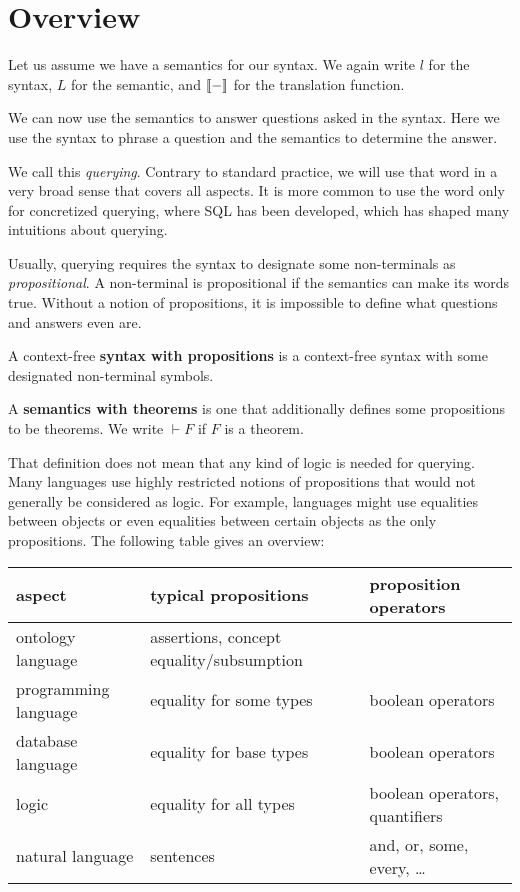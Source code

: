 \section{Overview}

Let us assume we have a semantics for our syntax.
We again write $l$ for the syntax, $L$ for the semantic, and $\llbracket -\rrbracket$ for the translation function.

We can now use the semantics to answer questions asked in the syntax.
Here we use the syntax to phrase a question and the semantics to determine the answer.

We call this \emph{querying}.
Contrary to standard practice, we will use that word in a very broad sense that covers all aspects.
It is more common to use the word only for concretized querying, where SQL has been developed, which has shaped many intuitions about querying.

Usually, querying requires the syntax to designate some non-terminals as \emph{propositional}.
A non-terminal is propositional if the semantics can make its words true.
Without a notion of propositions, it is impossible to define what questions and answers even are.

\begin{definition}[Propositions]
A context-free \textbf{syntax with propositions} is a context-free syntax with some designated non-terminal symbols.

A \textbf{semantics with theorems} is one that additionally defines some propositions to be theorems.
We write $\vdash F$ if $F$ is a theorem.
\end{definition}

That definition does not mean that any kind of logic is needed for querying.
Many languages use highly restricted notions of propositions that would not generally be considered as logic.
For example, languages might use equalities between objects or even equalities between certain objects as the only propositions.
The following table gives an overview:

\begin{center}
\begin{tabular}{l|l|l}
aspect & typical propositions & proposition operators\\
\hline
ontology language & assertions, concept equality/subsumption &\\
programming language & equality for some types &  boolean operators\\
database language & equality for base types &  boolean operators \\
logic & equality for all types & boolean operators, quantifiers\\
natural language & sentences & and, or, some, every, \ldots\\
\end{tabular}
\end{center}

